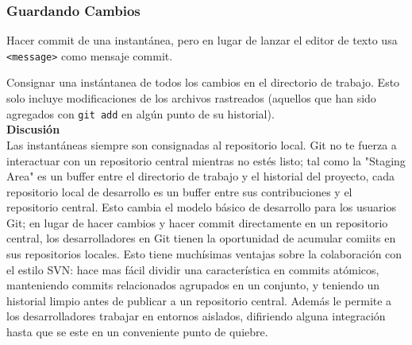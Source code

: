 \documentclass[8pt]{beamer}
\begin{document}
\begin{frame}
\frametitle{Guardando Cambios}

Hacer commit de una instant\'anea, pero en lugar de lanzar el editor de texto usa \texttt{<message>} como mensaje commit.

Consignar una inst\'antanea de todos los cambios en el directorio de trabajo. Esto solo incluye modificaciones de los archivos rastreados (aquellos que han sido agregados con \texttt{git add} en alg\'un punto de su historial).\\
\medskip
\textbf{Discusi\'on}\\
\medskip
Las instant\'aneas siempre son consignadas al repositorio local. Git no te fuerza a interactuar con un repositorio central mientras no est\'es listo; tal como la "Staging Area" es un buffer entre el directorio de trabajo y el historial del proyecto, cada repositorio local de desarrollo es un buffer entre sus contribuciones y el repositorio central. Esto cambia el modelo b\'asico de desarrollo para los usuarios Git; en lugar de hacer cambios y hacer commit directamente en un repositorio central, los desarrolladores en Git tienen la oportunidad de acumular comiits en sus repositorios locales. Esto tiene much\'isimas ventajas sobre la colaboraci\'on con el estilo SVN: hace mas f\'acil dividir una caracter\'istica en commits at\'omicos, manteniendo commits relacionados agrupados en un conjunto, y teniendo un historial limpio antes de publicar a un repositorio central. Adem\'as le permite a los desarrolladores trabajar en entornos aislados, difiriendo alguna integraci\'on hasta que se este en un conveniente punto de quiebre. 

\end{frame}
\end{document}
